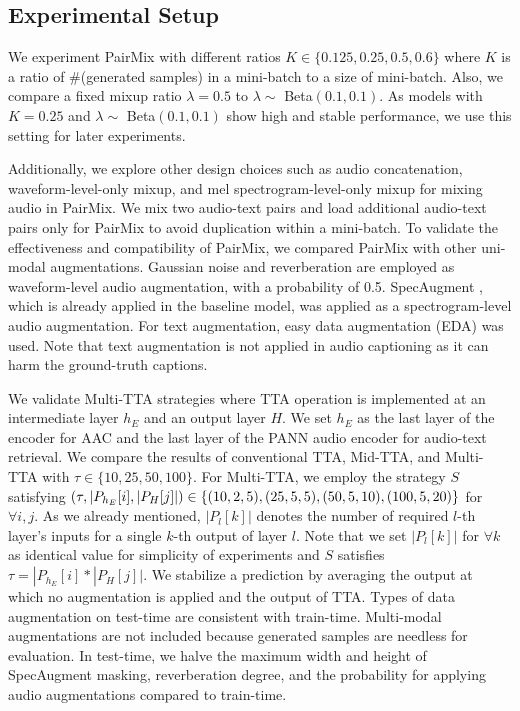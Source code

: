 \documentclass{INTERSPEECH2023}
\begin{document}
\subsection{Experimental Setup}
We experiment PairMix with different ratios $K\in \{0.125, 0.25, 0.5, 0.6\}$ where $K$ is a ratio of \#(generated samples) in a mini-batch to a size of mini-batch. Also, we compare a fixed mixup ratio $\lambda=0.5$ to $\lambda\sim$ Beta$(0.1, 0.1)$. As models with $K = 0.25$ and $\lambda\sim$ Beta$(0.1, 0.1)$ show high and stable performance, we use this setting for later experiments. 

Additionally, we explore other design choices such as audio concatenation, waveform-level-only mixup, and mel spectrogram-level-only mixup for mixing audio in PairMix. We mix two audio-text pairs and load additional audio-text pairs only for PairMix to avoid duplication within a mini-batch.
To validate the effectiveness and compatibility of PairMix, we compared PairMix with other uni-modal augmentations. Gaussian noise and reverberation are employed as waveform-level audio augmentation, with a probability of 0.5. SpecAugment \cite{park2019specaugment}, which is already applied in the baseline model, was applied as a spectrogram-level audio augmentation. For text augmentation, easy data augmentation (EDA) \cite{wei2019eda} was used. Note that text augmentation is not applied in audio captioning as it can harm the ground-truth captions. 

We validate Multi-TTA strategies where TTA operation is implemented at an intermediate layer $h_E$ and an output layer $H$. We set $h_E$ as the last layer of the encoder for AAC and the last layer of the PANN audio encoder for audio-text retrieval. We compare the results of conventional TTA, Mid-TTA, and Multi-TTA with $\tau\in\{10, 25, 50, 100\}$. For Multi-TTA, we employ the strategy $S$ satisfying $(\tau,|P_{h_E}[i],|P_H[j]|)\in\{(10, 2, 5), (25, 5, 5), (50, 5, 10),\\(100, 5, 20)\}$ for $\forall i, j$.
As we already mentioned, $|P_l[k]|$ denotes the number of required $l$-th layer's inputs for a single $k$-th output of layer $l$. Note that we set $|P_l[k]|$ for $\forall k$ as identical value for simplicity of experiments and $S$ satisfies $\tau=|P_{h_E}[i]*|P_H[j]|$.
We stabilize a prediction by averaging the output at which no augmentation is applied and the output of TTA. Types of data augmentation on test-time are consistent with train-time. Multi-modal augmentations are not included because generated samples are needless for evaluation. In test-time, we halve the maximum width and height of SpecAugment masking, reverberation degree, and the probability for applying audio augmentations compared to train-time.
\end{document}
